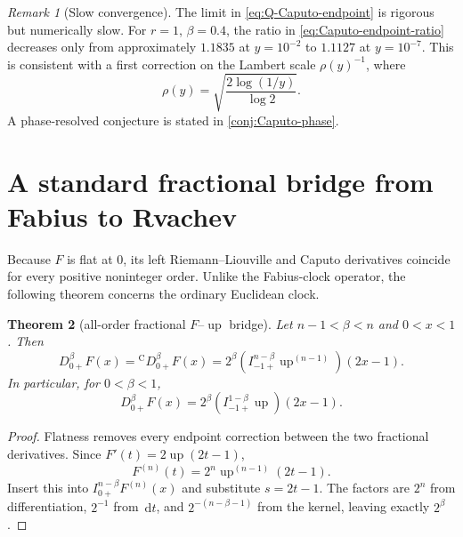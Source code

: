 \documentclass[11pt,oneside]{article}
\numberwithin{equation}{section}
\theoremstyle{plain}
\newtheorem{theorem}{Theorem}[section]
\theoremstyle{definition}
\theoremstyle{remark}
\newtheorem{remark}[theorem]{Remark}
\newcommand{\Up}{\operatorname{up}}
\newcommand{\dd}{\,\mathrm d}
\newcommand{\Ccap}{\mathrm C}
\begin{document}
\begin{remark}[Slow convergence]
The limit in \cref{eq:Q-Caputo-endpoint} is rigorous but numerically slow.
For $r=1$, $\beta=0.4$, the ratio in
\cref{eq:Caputo-endpoint-ratio} decreases only from approximately $1.1835$ at
$y=10^{-2}$ to $1.1127$ at $y=10^{-7}$.  This is consistent with a first
correction on the Lambert scale $\rho(y)^{-1}$, where
\begin{equation}
 \rho(y)=\sqrt{\frac{2\log(1/y)}{\log2}}.
 \label{eq:rho-y}
\end{equation}
A phase-resolved conjecture is stated in \cref{conj:Caputo-phase}.
\end{remark}

\section{A standard fractional bridge from Fabius to Rvachev}
\label{sec:F-up-bridge}

Because $F$ is flat at $0$, its left Riemann--Liouville and Caputo derivatives
coincide for every positive noninteger order.  Unlike the Fabius-clock
operator, the following theorem concerns the ordinary Euclidean clock.

\begin{theorem}[all-order fractional $F$--$\Up$ bridge]
\label{thm:F-up-bridge}
Let $n-1<\beta<n$ and $0<x<1$.  Then
\begin{equation}
 D_{0+}^\beta F(x)
 ={}^{\Ccap}D_{0+}^\beta F(x)
 =2^\beta
   \left(I_{-1+}^{n-\beta}\Up^{(n-1)}\right)(2x-1).
 \label{eq:F-up-bridge-general}
\end{equation}
In particular, for $0<\beta<1$,
\begin{equation}
 D_{0+}^\beta F(x)
 =2^\beta\left(I_{-1+}^{1-\beta}\Up\right)(2x-1).
 \label{eq:F-up-bridge-simple}
\end{equation}
\end{theorem}

\begin{proof}
Flatness removes every endpoint correction between the two fractional
derivatives.  Since $F'(t)=2\Up(2t-1)$,
\begin{equation}
 F^{(n)}(t)=2^n\Up^{(n-1)}(2t-1).
\end{equation}
Insert this into
$I_{0+}^{n-\beta}F^{(n)}(x)$ and substitute $s=2t-1$.  The factors are
$2^n$ from differentiation, $2^{-1}$ from $\dd t$, and
$2^{-(n-\beta-1)}$ from the kernel, leaving exactly $2^\beta$.
\end{proof}
\end{document}
